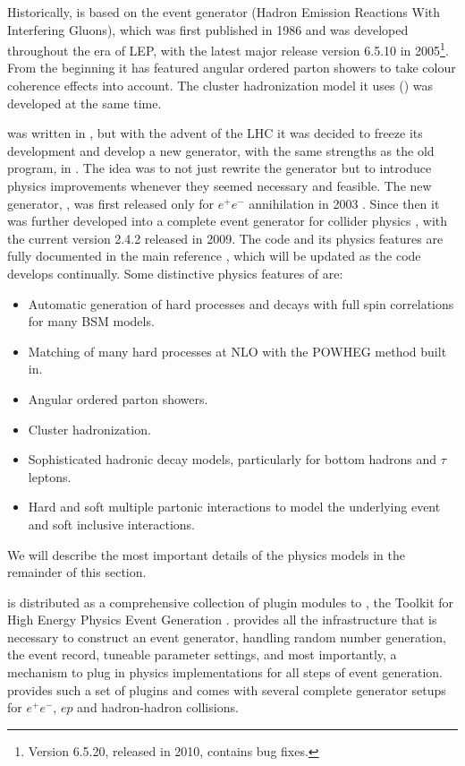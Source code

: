 \mcsubsection{\gensectionintro}

Historically, \herwigpp is based on the event generator \Herwig 
(Hadron Emission Reactions With Interfering
Gluons), which was first published in 1986 \cite{Marchesini:1987cf} and was
developed throughout the era of LEP, with the latest major release
version 6.5.10 \cite{Corcella:2000bw,Corcella:2002jc} in
2005\footnote{Version 6.5.20, released in 2010, contains bug fixes.}. From the
beginning it has featured angular ordered parton showers to take colour
coherence effects into account.  The cluster hadronization model it uses
() was developed at the same time.

\herwig was written  in \fortran, but
with the advent of the LHC it was decided to freeze its development and
develop a new generator, with the same strengths as the old program, in
\cpp.  The idea was to not just rewrite the generator but to introduce
physics improvements whenever they seemed necessary and feasible.  The
new generator, \Herwigpp, was first released only for $e^+e^-$
annihilation in 2003 \cite{Gieseke:2003hm}.  Since then it was
further developed into a complete event generator for collider
physics \cite{Bahr:2008tf}, with the current version 2.4.2 released in 2009.
The code and its physics features are fully documented in the main
reference \cite{Bahr:2008pv}, which will be updated as the code
develops continually. Some distinctive physics features of \Herwigpp are:
\begin{itemize}
\item Automatic generation of hard processes and decays with full spin
  correlations for many BSM models.
\item Matching of many hard processes at NLO with the POWHEG method
  built in. 
\item Angular ordered parton showers. 
\item Cluster hadronization.
\item Sophisticated hadronic decay models, particularly for bottom
  hadrons and $\tau$ leptons. 
\item Hard and soft multiple partonic interactions to  model the
  underlying event and soft inclusive interactions. 
\end{itemize}
We will describe the most important details of the physics models in the
remainder of this section.

\label{sec:thepeg}

\Herwigpp is distributed as a comprehensive collection of plugin
modules to \thepeg, the Toolkit for High
Energy Physics Event Generation \cite{Lonnblad:2006pt}. 
\thepeg provides all the infrastructure that
is necessary to construct an event generator, handling \eg random
number generation, the event record, tuneable parameter settings, and
most importantly, a mechanism to plug in physics implementations for
all steps of event generation. \Herwigpp provides such a set of
plugins and comes with several complete generator setups for $e^+e^-$,
$ep$ and hadron-hadron collisions. 

